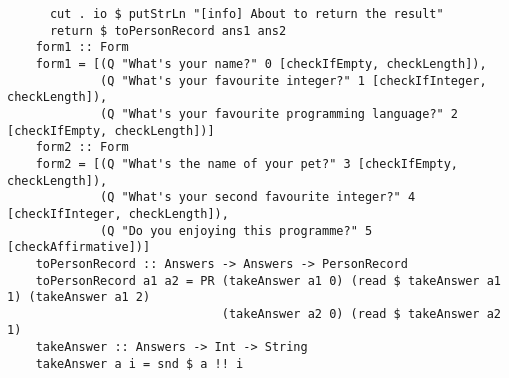\documentclass[10pt]{article}
\begin{document}
\begin{lstlisting}
      cut . io $ putStrLn "[info] About to return the result"                                                                                                                                 
      return $ toPersonRecord ans1 ans2                                                                                                                                                       
    form1 :: Form                                                                                                                                                                             
    form1 = [(Q "What's your name?" 0 [checkIfEmpty, checkLength]),                                                                                                                           
             (Q "What's your favourite integer?" 1 [checkIfInteger, checkLength]),                                                                                                            
             (Q "What's your favourite programming language?" 2 [checkIfEmpty, checkLength])]                                                                                                 
    form2 :: Form                                                                                                                                                                             
    form2 = [(Q "What's the name of your pet?" 3 [checkIfEmpty, checkLength]),                                                                                                                
             (Q "What's your second favourite integer?" 4 [checkIfInteger, checkLength]),                                                                                                     
             (Q "Do you enjoying this programme?" 5 [checkAffirmative])]                                                                                                                      
    toPersonRecord :: Answers -> Answers -> PersonRecord                                                                                                                                      
    toPersonRecord a1 a2 = PR (takeAnswer a1 0) (read $ takeAnswer a1 1) (takeAnswer a1 2)                                                                                                    
                              (takeAnswer a2 0) (read $ takeAnswer a2 1)                                                                                                                      
    takeAnswer :: Answers -> Int -> String                                                                                                                                                    
    takeAnswer a i = snd $ a !! i
\end{lstlisting}
\end{document}
